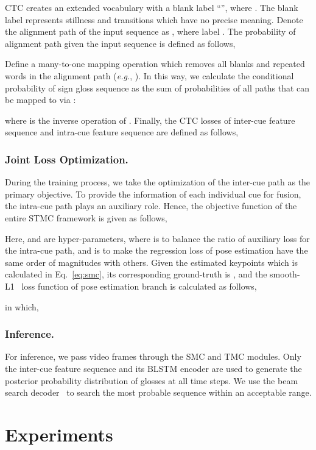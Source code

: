 \documentclass[letterpaper]{article} \usepackage{aaai20}  \usepackage{times}  \usepackage{helvet} \usepackage{courier}  \usepackage[hyphens]{url}  \usepackage{graphicx} \urlstyle{rm} \def\UrlFont{\rm}  \usepackage{graphicx}  \frenchspacing  \setlength{\pdfpagewidth}{8.5in}  \setlength{\pdfpageheight}{11in}
\begin{document}
CTC creates an extended vocabulary  with a blank label ``'', where . The blank label represents stillness and transitions which have no precise meaning. 
Denote the alignment path of the input sequence as , where label . The probability of alignment path  given the input sequence is defined as follows,


Define a many-to-one mapping operation  which removes all blanks and repeated words in the alignment path (\emph{e.g.}, ). In this way, we calculate the conditional probability of sign gloss sequence  as the sum of probabilities of all paths that can be mapped to  via :

where  is the inverse operation of . Finally, the CTC losses of inter-cue feature sequence  and intra-cue feature sequence  are defined as follows,



\subsubsection{Joint Loss Optimization.}
During the training process, we take the optimization of the inter-cue path as the primary objective. To provide the information of each individual cue for fusion, the intra-cue path plays an auxiliary role. Hence, the objective function of the entire STMC framework is given as follows,
 
Here,  and  are hyper-parameters, where  is to balance the ratio of auxiliary loss for the intra-cue path, and  is to make the regression loss  of pose estimation have the same order of magnitudes with others. 
Given the estimated keypoints  which is calculated in Eq.~\ref{eq:smc}, its corresponding ground-truth is , and the smooth-L1~\cite{girshick2015fast} loss function of pose estimation branch is calculated as follows,

in which,


\subsubsection{Inference.}
For inference, we pass video frames through the SMC and TMC modules. Only the inter-cue feature sequence and its BLSTM encoder are used to generate the posterior probability distribution of glosses at all time steps. We use the beam search decoder~\cite{deepspeech} to search the most probable sequence within an acceptable range.

\section{Experiments}
\end{document}
